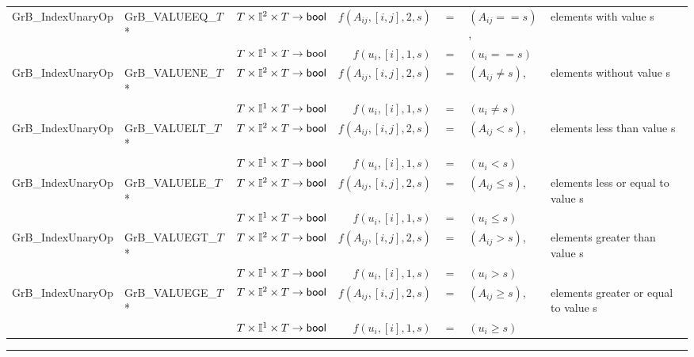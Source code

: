 \begin{landscape}
\begin{table}[h]
\begin{threeparttable}
\begin{tabular}{l|l|l|rcll}
{\sf GrB\_IndexUnaryOp}   & {\sf GrB\_VALUEEQ\_$T$}*  & $T \times \mathbb{I}^2 \times T \rightarrow {\sf bool} $ & $f(A_{ij},[i,j],2,s)$ & $=$ & $(A_{ij} == s)$, & elements with value s \\
                          &                            & $T \times \mathbb{I}^1 \times T \rightarrow {\sf bool} $ & $f(u_{i},[i],1,s)$ & $=$ & $(u_{i} == s)$ \\
{\sf GrB\_IndexUnaryOp}   & {\sf GrB\_VALUENE\_$T$}*  & $T \times \mathbb{I}^2 \times T \rightarrow {\sf bool} $ & $f(A_{ij},[i,j],2,s)$ & $=$ & $(A_{ij} \neq s)$, & elements without value s \\
                          &                            & $T \times \mathbb{I}^1 \times T \rightarrow {\sf bool} $ & $f(u_{i},[i],1,s)$ & $=$ & $(u_{i} \neq s)$ \\
{\sf GrB\_IndexUnaryOp}   & {\sf GrB\_VALUELT\_$T$}*  & $T \times \mathbb{I}^2 \times T \rightarrow {\sf bool} $ & $f(A_{ij},[i,j],2,s)$ & $=$ & $(A_{ij} < s)$, & elements less than value s \\
                          &                            & $T \times \mathbb{I}^1 \times T \rightarrow {\sf bool} $ & $f(u_{i},[i],1,s)$ & $=$ & $(u_{i} < s)$ \\
{\sf GrB\_IndexUnaryOp}   & {\sf GrB\_VALUELE\_$T$}*  & $T \times \mathbb{I}^2 \times T \rightarrow {\sf bool} $ & $f(A_{ij},[i,j],2,s)$ & $=$ & $(A_{ij} \leq s)$, & elements less or equal to value s \\
                          &                            & $T \times \mathbb{I}^1 \times T \rightarrow {\sf bool} $ & $f(u_{i},[i],1,s)$ & $=$ & $(u_{i} \leq s)$ \\
{\sf GrB\_IndexUnaryOp}   & {\sf GrB\_VALUEGT\_$T$}*  & $T \times \mathbb{I}^2 \times T \rightarrow {\sf bool} $ & $f(A_{ij},[i,j],2,s)$ & $=$ & $(A_{ij} > s)$, & elements greater than value s \\
                          &                            & $T \times \mathbb{I}^1 \times T \rightarrow {\sf bool} $ & $f(u_{i},[i],1,s)$ & $=$ & $(u_{i} > s)$ \\
{\sf GrB\_IndexUnaryOp}   & {\sf GrB\_VALUEGE\_$T$}*  & $T \times \mathbb{I}^2 \times T \rightarrow {\sf bool} $ & $f(A_{ij},[i,j],2,s)$ & $=$ & $(A_{ij} \geq s)$, & elements greater or equal to value s \\
                          &                            & $T \times \mathbb{I}^1 \times T \rightarrow {\sf bool} $ & $f(u_{i},[i],1,s)$ & $=$ & $(u_{i} \geq s)$ \\
\end{tabular}
\hrule
\end{threeparttable}
\end{table}

\end{landscape}

